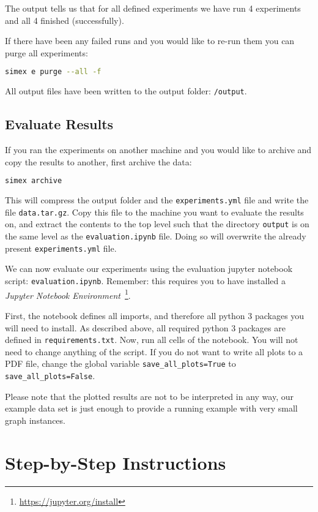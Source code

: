 \documentclass[11pt, a4paper]{scrartcl}
\newcommand{\expfile}{\texttt{experiments.yml} file\xspace}
\begin{document}
The output tells us that for all defined experiments we have run 4 experiments
and all 4 finished (successfully).

If there have been any failed runs and you would like to re-run them you can
purge all experiments:

\begin{lstlisting}[language=bash]
simex e purge --all -f
\end{lstlisting}

All output files have been written to the output folder: \texttt{/output}.

\subsection{Evaluate Results}

If you ran the experiments on another machine and you would like to archive and
copy the results to another, first archive the data:

\begin{lstlisting}[language=bash]
simex archive
\end{lstlisting}

This will compress the output folder and the \expfile and write the file
\texttt{data.tar.gz}. Copy this file to the machine you want to evaluate the
results on, and extract the contents to the top level such that the directory
\texttt{output} is on the same level as the \texttt{evaluation.ipynb} file.
Doing so will overwrite the already present \expfile.

We can now evaluate our experiments using the evaluation jupyter notebook
script: \texttt{evaluation.ipynb}. Remember: this requires you to have installed
a \emph{Jupyter Notebook
Environment}~\footnote{\url{https://jupyter.org/install}}.

First, the notebook defines all imports, and therefore all python 3 packages you
will need to install. As described above, all required python 3 packages are
defined in \texttt{requirements.txt}. Now, run all cells of the notebook. You
will not need to change anything of the script. If you do not want to write all
plots to a PDF file, change the global variable \texttt{save\_all\_plots=True} to
\texttt{save\_all\_plots=False}.

Please note that the plotted results are not to be interpreted in any way, our
example data set is just enough to provide a running example with very small
graph instances.

\section{Step-by-Step Instructions}
\end{document}
